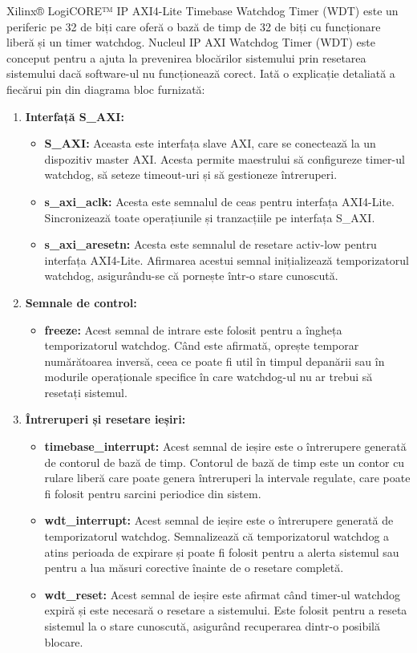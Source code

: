 \documentclass[12pt]{article}
\begin{document}
\hspace*{1cm}Xilinx® LogiCORE™ IP AXI4-Lite Timebase Watchdog Timer (WDT) este un periferic pe 32 de biți care oferă o bază de timp de 32 de biți cu funcționare liberă și un timer watchdog.
\hspace*{1cm}Nucleul IP AXI Watchdog Timer (WDT) este conceput pentru a ajuta la prevenirea blocărilor sistemului prin resetarea sistemului dacă software-ul nu funcționează corect. Iată o explicație detaliată a fiecărui pin din diagrama bloc furnizată:
\begin{enumerate}
    \item \textbf{Interfață S\_AXI:}
    \begin{itemize}
        \item \textbf{S\_AXI:} Aceasta este interfața slave AXI, care se conectează la un dispozitiv master AXI. Acesta permite maestrului să configureze timer-ul watchdog, să seteze timeout-uri și să gestioneze întreruperi.
        \item \textbf{s\_axi\_aclk:} Acesta este semnalul de ceas pentru interfața AXI4-Lite. Sincronizează toate operațiunile și tranzacțiile pe interfața S\_AXI.
        \item \textbf{s\_axi\_aresetn:} Acesta este semnalul de resetare activ-low pentru interfața AXI4-Lite. Afirmarea acestui semnal inițializează temporizatorul watchdog, asigurându-se că pornește într-o stare cunoscută.
    \end{itemize}
    \item \textbf{Semnale de control:}
    \begin{itemize}
        \item \textbf{freeze:} Acest semnal de intrare este folosit pentru a îngheța temporizatorul watchdog. Când este afirmată, oprește temporar numărătoarea inversă, ceea ce poate fi util în timpul depanării sau în modurile operaționale specifice în care watchdog-ul nu ar trebui să resetați sistemul.
    \end{itemize}
    \item \textbf{Întreruperi și resetare ieșiri:}
    \begin{itemize}
        \item \textbf{timebase\_interrupt:} Acest semnal de ieșire este o întrerupere generată de contorul de bază de timp. Contorul de bază de timp este un contor cu rulare liberă care poate genera întreruperi la intervale regulate, care poate fi folosit pentru sarcini periodice din sistem.
        \item \textbf{wdt\_interrupt:} Acest semnal de ieșire este o întrerupere generată de temporizatorul watchdog. Semnalizează că temporizatorul watchdog a atins perioada de expirare și poate fi folosit pentru a alerta sistemul sau pentru a lua măsuri corective înainte de o resetare completă.
        \item \textbf{wdt\_reset:} Acest semnal de ieșire este afirmat când timer-ul watchdog expiră și este necesară o resetare a sistemului. Este folosit pentru a reseta sistemul la o stare cunoscută, asigurând recuperarea dintr-o posibilă blocare.\\
    \end{itemize}
\end{enumerate}
\end{document}
